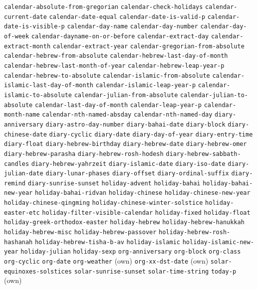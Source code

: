 \documentclass[11pt]{article}
\begin{document}
\texttt{calendar-absolute-from-gregorian} \texttt{calendar-check-holidays} \texttt{calendar-current-date} \texttt{calendar-date-equal} \texttt{calendar-date-is-valid-p} \texttt{calendar-date-is-visible-p} \texttt{calendar-day-name} \texttt{calendar-day-number} \texttt{calendar-day-of-week} \texttt{calendar-dayname-on-or-before} \texttt{calendar-extract-day} \texttt{calendar-extract-month} \texttt{calendar-extract-year} \texttt{calendar-gregorian-from-absolute} \texttt{calendar-hebrew-from-absolute} \texttt{calendar-hebrew-last-day-of-month} \texttt{calendar-hebrew-last-month-of-year} \texttt{calendar-hebrew-leap-year-p} \texttt{calendar-hebrew-to-absolute} \texttt{calendar-islamic-from-absolute} \texttt{calendar-islamic-last-day-of-month} \texttt{calendar-islamic-leap-year-p} \texttt{calendar-islamic-to-absolute} \texttt{calendar-julian-from-absolute} \texttt{calendar-julian-to-absolute} \texttt{calendar-last-day-of-month} \texttt{calendar-leap-year-p} \texttt{calendar-month-name} \texttt{calendar-nth-named-absday} \texttt{calendar-nth-named-day} \texttt{diary-anniversary} \texttt{diary-astro-day-number} \texttt{diary-bahai-date} \texttt{diary-block} \texttt{diary-chinese-date} \texttt{diary-cyclic} \texttt{diary-date} \texttt{diary-day-of-year} \texttt{diary-entry-time} \texttt{diary-float} \texttt{diary-hebrew-birthday} \texttt{diary-hebrew-date} \texttt{diary-hebrew-omer} \texttt{diary-hebrew-parasha} \texttt{diary-hebrew-rosh-hodesh} \texttt{diary-hebrew-sabbath-candles} \texttt{diary-hebrew-yahrzeit} \texttt{diary-islamic-date} \texttt{diary-iso-date} \texttt{diary-julian-date} \texttt{diary-lunar-phases} \texttt{diary-offset} \texttt{diary-ordinal-suffix} \texttt{diary-remind} \texttt{diary-sunrise-sunset} \texttt{holiday-advent} \texttt{holiday-bahai} \texttt{holiday-bahai-new-year} \texttt{holiday-bahai-ridvan} \texttt{holiday-chinese} \texttt{holiday-chinese-new-year} \texttt{holiday-chinese-qingming} \texttt{holiday-chinese-winter-solstice} \texttt{holiday-easter-etc} \texttt{holiday-filter-visible-calendar} \texttt{holiday-fixed} \texttt{holiday-float} \texttt{holiday-greek-orthodox-easter} \texttt{holiday-hebrew} \texttt{holiday-hebrew-hanukkah} \texttt{holiday-hebrew-misc} \texttt{holiday-hebrew-passover} \texttt{holiday-hebrew-rosh-hashanah} \texttt{holiday-hebrew-tisha-b-av} \texttt{holiday-islamic} \texttt{holiday-islamic-new-year} \texttt{holiday-julian} \texttt{holiday-sexp} \texttt{org-anniversary} \texttt{org-block} \texttt{org-class} \texttt{org-cyclic} \texttt{org-date} \texttt{org-weather} (own) \texttt{org-xx-dst-date} (own) \texttt{solar-equinoxes-solstices} \texttt{solar-sunrise-sunset} \texttt{solar-time-string} \texttt{today-p} (own)
\end{document}
